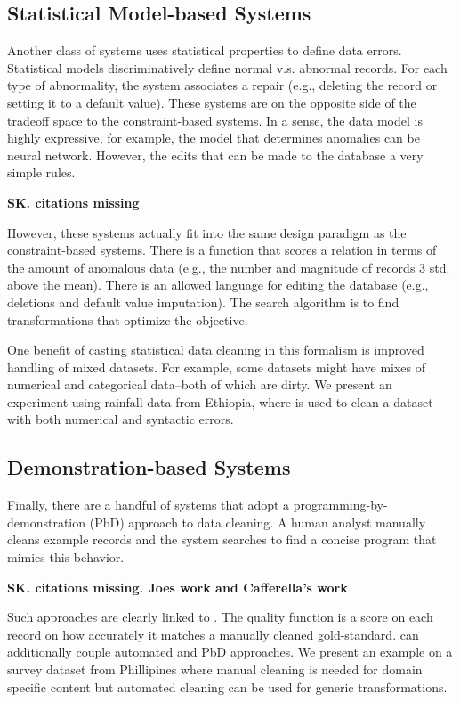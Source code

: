 \subsection{Statistical Model-based Systems}
Another class of systems uses statistical properties to define data errors. Statistical models discriminatively define normal v.s. abnormal records.
For each type of abnormality, the system associates a repair (e.g., deleting the record or setting it to a default value).
These systems are on the opposite side of the tradeoff space to the constraint-based systems.
In a sense, the data model is highly expressive, for example, the model that determines anomalies can be neural network. However, the edits that can be made to the database a very simple rules.

\textbf{SK. citations missing}

However, these systems actually fit into the same design paradigm as the constraint-based systems.
There is a function that scores a relation in terms of the amount of anomalous data (e.g., the number and magnitude of records 3 std. above the mean). There is an allowed language for editing the database (e.g., deletions and default value imputation).
The search algorithm is to find transformations that optimize the objective.

One benefit of casting statistical data cleaning in this formalism is improved handling of mixed datasets.
For example, some datasets might have mixes of numerical and categorical data--both of which are dirty.
We present an experiment using rainfall data from Ethiopia, where \sys is used to clean a dataset with both numerical and syntactic errors.

\subsection{Demonstration-based Systems}
Finally, there are a handful of systems that adopt a programming-by-demonstration (PbD) approach to data cleaning.
A human analyst manually cleans example records and the system searches to find a concise program that mimics this behavior.

\textbf{SK. citations missing. Joes work and Cafferella's work}


Such approaches are clearly linked to \sys. The quality function is a score on each record on how accurately it matches a manually cleaned gold-standard. \sys can additionally couple automated and PbD approaches. We present an example on a survey dataset from Phillipines where manual cleaning is needed for domain specific content but automated cleaning can be used for generic transformations.












